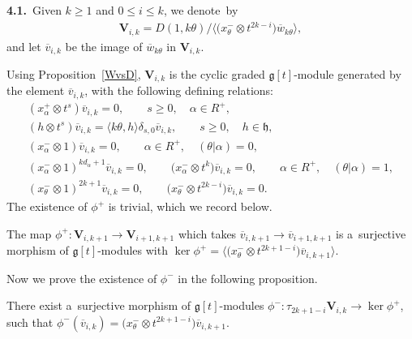 \documentclass[pdftex]{sigma}
\numberwithin{equation}{section}
\begin{document}
{\bf 4.1.}~Given $k\geq 1$ and $0\leq i \leq k $, we denote~by
\begin{gather*}
\mathbf{V}_{i,k} = D(1, k\theta)/\big\langle \big(x^{-}_\theta \otimes t^{2k-i}\big) \overline{w}_{k\theta} \big\rangle,
\end{gather*}
and let $\overline{v}_{i,k}$ be the image of $\overline{w}_{k\theta}$ in $\mathbf{V}_{i,k}$.

Using Proposition~\ref{WvsD}, $\mathbf{V}_{i,k}$ is the cyclic graded $\mathfrak{g}[t]$-module generated by the element
$\overline{v}_{i,k}$, with the following def\/ining relations:
\begin{gather}
(x^{+}_{\alpha}\otimes t^s)\overline{v}_{i,k}=0,
\qquad
s\geq 0,\quad \alpha\in R^+,
\label{r1}
\\
(h \otimes t^s) \overline{v}_{i,k} = \langle k\theta, h\rangle \delta_{s,0} \overline{v}_{i,k},
\qquad
s\geq0,
\quad
h\in\mathfrak{h},
\label{r2}
\\
(x^{-}_{\alpha}\otimes 1) \overline{v}_{i,k}=0,
\qquad
\alpha\in R^+,
\quad
(\theta|\alpha)=0,
\label{r3}
\\
(x^{-}_{\alpha}\otimes 1)^{kd_{\alpha}+1} \overline{v}_{i,k}=0,
\qquad
\big(x^{-}_{\alpha} \otimes t^k\big) \overline{v}_{i,k}=0,
\qquad
\alpha\in R^+,
\quad
(\theta|\alpha)=1,
\label{r4}
\\
(x^{-}_{\theta}\otimes 1)^{2k+1} \overline{v}_{i,k}=0,
\qquad
\big(x^{-}_{\theta} \otimes t^{2k-i}\big) \overline{v}_{i,k}=0.
\label{r5}
\end{gather}
The existence of $\phi^{+}$ is trivial, which we record below.
\begin{proposition}
The map $\phi^{+} : \mathbf{V}_{i,k+1} \rightarrow \mathbf{V}_{i+1,k+1}$ which takes $\overline{v}_{i,k+1}
\rightarrow \overline{v}_{i+1,k+1}$ is a~surjective morphism of $\mathfrak{g}[t]$-modules with $\ker \phi^{+} = \big\langle
\big({x^{-}_\theta} \otimes t^{2k+1-i}\big) \overline{v}_{i,k+1}\big\rangle$.
\end{proposition}

Now we prove the existence of $\phi^{-}$ in the following proposition.
\begin{proposition}
There exist a~surjective morphism of $\mathfrak{g}[t]$-modules $\phi^{-} : \tau_{2k+1-i} \mathbf{V}_{i,k}
\rightarrow \ker \phi^{+}$,
such that $\phi^{-}(\overline{v}_{i,k}) = \big(x^{-}_\theta \otimes t^{2k+1-i}\big) \overline{v}_{i,k+1}$.
\end{proposition}
\end{document}
